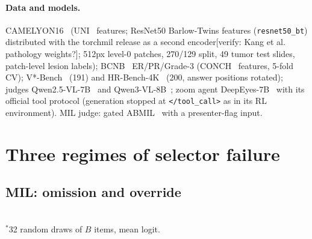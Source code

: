 \documentclass[10pt,twocolumn,letterpaper]{article}
\newcommand{\pend}[1]{{\color{red}[#1]}}
\begin{document}
\paragraph{Data and models.} CAMELYON16~\cite{c16} (UNI~\cite{uni} features; ResNet50 Barlow-Twins features (\texttt{resnet50\_bt}) distributed with the torchmil release as a second encoder\pend{verify: Kang et al.~\cite{kang2023benchmarking} pathology weights?}; 512px level-0 patches, 270/129 split, 49 tumor test slides, patch-level lesion labels); BCNB~\cite{bcnb} ER/PR/Grade-3 (CONCH~\cite{conch} features, 5-fold CV); V*-Bench~\cite{wu2024vstar} (191) and HR-Bench-4K~\cite{hrbench} (200, answer positions rotated); judges Qwen2.5-VL-7B~\cite{qwen25vl} and Qwen3-VL-8B~\cite{qwen3vl}; zoom agent DeepEyes-7B~\cite{zheng2025deepeyes} with its official tool protocol (generation stopped at \texttt{</tool\_call>} as in its RL environment). MIL judge: gated ABMIL~\cite{ilse2018abmil} with a presenter-flag input.

\section{Three regimes of selector failure}\label{sec:regimes}
\subsection{MIL: omission and override}
\begin{table}[t]\centering\small
\caption{\textbf{CAMELYON16} (BA, mean$\pm$sd over 3 seeds; full-slide ABMIL .969). $B$ = items inspected by the judge. Cooperative selectors are accurate but are driven to $\approx$0 by a white-box selector.}\label{tab:c16}
\setlength{\tabcolsep}{3pt}
\\[1pt]{\footnotesize $^\ast$32 random draws of $B$ items, mean logit.}
\end{table}
\end{document}
